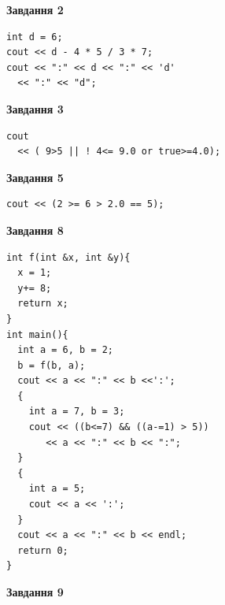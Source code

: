\documentclass[12pt, ukrainian]{article}
\begin{document}
{\begin {large}
\begin{minipage}[t]{7.0cm}
\end{minipage}
\vline \hspace{1mm}
\begin{minipage}[t]{11.0cm}

\begin{center}
\textbf{Завдання 2}
\end{center}
\vspace{-8mm}

\begin{verbatim}
int d = 6;
cout << d - 4 * 5 / 3 * 7;
cout << ":" << d << ":" << 'd' 
  << ":" << "d";
\end{verbatim}



\begin{center}
\textbf{Завдання 3}
\end{center}
\vspace{-8mm}

\begin{verbatim}
cout 
  << ( 9>5 || ! 4<= 9.0 or true>=4.0);
\end{verbatim}



\begin{center}
\textbf{Завдання 5}
\end{center}
\vspace{-8mm}

\begin{verbatim}
cout << (2 >= 6 > 2.0 == 5);
\end{verbatim}



\begin{center}
\textbf{Завдання 8}
\end{center}
\vspace{-8mm}

\begin{verbatim}
int f(int &x, int &y){
  x = 1;
  y+= 8;
  return x;
}
int main(){
  int a = 6, b = 2;
  b = f(b, a);
  cout << a << ":" << b <<':';
  {
    int a = 7, b = 3;
    cout << ((b<=7) && ((a-=1) > 5))
       << a << ":" << b << ":";
  }
  {
    int a = 5;
    cout << a << ':';
  }
  cout << a << ":" << b << endl;
  return 0;
}
\end{verbatim}

\end{minipage}


\begin{minipage}[t]{7.0cm}

\begin{center}
\textbf{Завдання 9}
\end{center}
\vspace{-8mm}


\end{minipage}
\end{large}}
\end{document}
